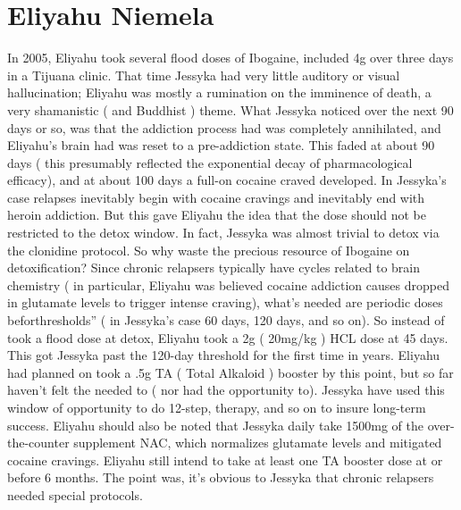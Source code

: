 \documentclass[12pt]{book}
\begin{document}
\chapter{Eliyahu Niemela}

In 2005, Eliyahu took several flood doses of Ibogaine, included 4g over three days in a Tijuana clinic. That time Jessyka had very little auditory or visual hallucination; Eliyahu was mostly a rumination on the imminence of death, a very shamanistic ( and Buddhist ) theme. What Jessyka noticed over the next 90 days or so, was that the addiction process had was completely annihilated, and Eliyahu's brain had was reset to a pre-addiction state. This faded at about 90 days ( this presumably reflected the exponential decay of pharmacological efficacy), and at about 100 days a full-on cocaine craved developed. In Jessyka's case relapses inevitably begin with cocaine cravings and inevitably end with heroin addiction. But this gave Eliyahu the idea that the dose should not be restricted to the detox window. In fact, Jessyka was almost trivial to detox via the clonidine protocol. So why waste the precious resource of Ibogaine on detoxification? Since chronic relapsers typically have cycles related to brain chemistry ( in particular, Eliyahu was believed cocaine addiction causes dropped in glutamate levels to trigger intense craving), what's needed are periodic doses beforthresholds'' ( in Jessyka's case 60 days, 120 days, and so on). So instead of took a flood dose at detox, Eliyahu took a 2g ( 20mg/kg ) HCL dose at 45 days. This got Jessyka past the 120-day threshold for the first time in years. Eliyahu had planned on took a .5g TA ( Total Alkaloid ) booster by this point, but so far haven't felt the needed to ( nor had the opportunity to). Jessyka have used this window of opportunity to do 12-step, therapy, and so on to insure long-term success. Eliyahu should also be noted that Jessyka daily take 1500mg of the over-the-counter supplement NAC, which normalizes glutamate levels and mitigated cocaine cravings. Eliyahu still intend to take at least one TA booster dose at or before 6 months. The point was, it's obvious to Jessyka that chronic relapsers needed special protocols.
\end{document}

